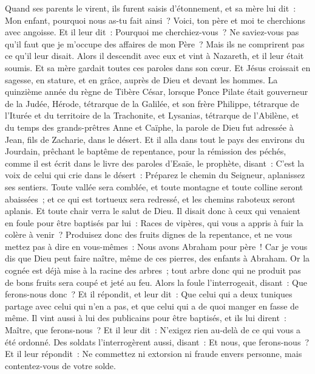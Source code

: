 \begin{multicols}{2}
Quand ses parents le virent, ils furent saisis d'étonnement, et sa mère lui dit~: Mon enfant, pourquoi nous as-tu fait ainsi~? Voici, ton père et moi te cherchions avec angoisse.
Et il leur dit~: Pourquoi me cherchiez-vous~? Ne saviez-vous pas qu'il faut que je m'occupe des affaires de mon Père~?
Mais ils ne comprirent pas ce qu'il leur disait.
Alors il descendit avec eux et vint à Nazareth, et il leur était soumis. Et sa mère gardait toutes ces paroles dans son cœur.
Et Jésus croissait en sagesse, en stature, et en grâce, auprès de Dieu et devant les hommes.
\VerseOne{}La quinzième année du règne de Tibère César, lorsque Ponce Pilate était gouverneur de la Judée, Hérode, tétrarque de la Galilée, et son frère Philippe, tétrarque de l'Iturée et du territoire de la Trachonite, et Lysanias, tétrarque de l'Abilène,
et du temps des grands-prêtres Anne et Caïphe, la parole de Dieu fut adressée à Jean, fils de Zacharie, dans le désert.
Et il alla dans tout le pays des environs du Jourdain, prêchant le baptême de repentance, pour la rémission des péchés,
comme il est écrit dans le livre des paroles d'Esaïe, le prophète, disant~: C'est la voix de celui qui crie dans le désert~: Préparez le chemin du Seigneur, aplanissez ses sentiers.
Toute vallée sera comblée, et toute montagne et toute colline seront abaissées~; et ce qui est tortueux sera redressé, et les chemins raboteux seront aplanis.
Et toute chair verra le salut de Dieu.
Il disait donc à ceux qui venaient en foule pour être baptisés par lui~: Races de vipères, qui vous a appris à fuir la colère à venir~?
Produisez donc des fruits dignes de la repentance, et ne vous mettez pas à dire en vous-mêmes~: Nous avons Abraham pour père~! Car je vous dis que Dieu peut faire naître, même de ces pierres, des enfants à Abraham.
Or la cognée est déjà mise à la racine des arbres~; tout arbre donc qui ne produit pas de bons fruits sera coupé et jeté au feu.
Alors la foule l'interrogeait, disant~: Que ferons-nous donc~?
Et il répondit, et leur dit~: Que celui qui a deux tuniques partage avec celui qui n'en a pas, et que celui qui a de quoi manger en fasse de même.
Il vint aussi à lui des publicains pour être baptisés, et ils lui dirent~: Maître, que ferons-nous~?
Et il leur dit~: N'exigez rien au-delà de ce qui vous a été ordonné.
Des soldats l'interrogèrent aussi, disant~: Et nous, que ferons-nous~? Et il leur répondit~: Ne commettez ni extorsion ni fraude envers personne, mais contentez-vous de votre solde.

\end{multicols}

